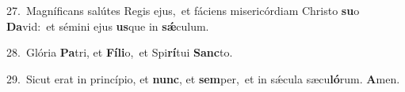 {\numbfont\textcolor{\numbcolor}{27.}}~Magníficans salútes Regis ejus,~\dagger et fáciens misericórdiam Christo \textbf{su}\-o \textbf{Da}\-vid:~\star et sémini ejus \textbf{us}\-que in \textbf{sǽ}\-culum.\par
{\numbfont\textcolor{\numbcolor}{28.}}~Glória \textbf{Pa}\-tri, et \textbf{Fí}\-\textbf{li}o,~\star et Spi\-\textbf{rí}\-tui \textbf{Sanc}\-to.\par
{\numbfont\textcolor{\numbcolor}{29.}}~Sicut erat in princípio, et \textbf{nunc}\-, et \textbf{sem}\-per,~\star et in sǽcula sæcu\-\textbf{ló}\-rum. \textbf{A}\-men.\par
